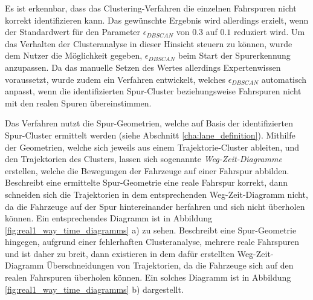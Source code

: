 Es ist erkennbar, dass das Clustering-Verfahren die einzelnen Fahrspuren nicht korrekt identifizieren
kann. Das gewünschte Ergebnis wird allerdings erzielt, wenn der Standardwert für den Parameter $\epsilon_{DBSCAN}$
von $0.3$ auf $0.1$ reduziert wird. Um das Verhalten der Clusteranalyse in dieser Hinsicht steuern zu können,
wurde dem Nutzer die Möglichkeit gegeben, $\epsilon_{DBSCAN}$ beim Start der Spurerkennung anzupassen.
Da das manuelle Setzen des Wertes allerdings Expertenwissen voraussetzt, wurde zudem ein Verfahren entwickelt,
welches $\epsilon_{DBSCAN}$ automatisch anpasst, wenn die identifizierten Spur-Cluster beziehungsweise Fahrspuren
nicht mit den realen Spuren übereinstimmen.

Das Verfahren nutzt die Spur-Geometrien, welche auf Basis
der identifizierten Spur-Cluster ermittelt werden (siehe Abschnitt \ref{cha:lane_definition}).
Mithilfe der Geometrien, welche sich jeweils aus einem Trajektorie-Cluster ableiten, und den Trajektorien des
Clusters, lassen sich sogenannte \textit{Weg-Zeit-Diagramme} erstellen, welche die Bewegungen der Fahrzeuge auf einer
Fahrspur abbilden.
Beschreibt eine ermittelte Spur-Geometrie eine reale Fahrspur korrekt, dann schneiden sich die Trajektorien
in dem entsprechenden Weg-Zeit-Diagramm nicht, da die Fahrzeuge auf der Spur hintereinander herfahren
und sich nicht überholen können. Ein entsprechendes Diagramm ist in Abbildung \ref{fig:real1_way_time_diagramms} a) zu sehen.
Beschreibt eine Spur-Geometrie hingegen, aufgrund einer fehlerhaften Clusteranalyse, mehrere reale Fahrspuren
und ist daher zu breit, dann existieren in dem dafür erstellten Weg-Zeit-Diagramm Überschneidungen von Trajektorien,
da die Fahrzeuge sich auf den realen Fahrspuren überholen können. Ein solches Diagramm ist in
Abbildung \ref{fig:real1_way_time_diagramms} b) dargestellt.

